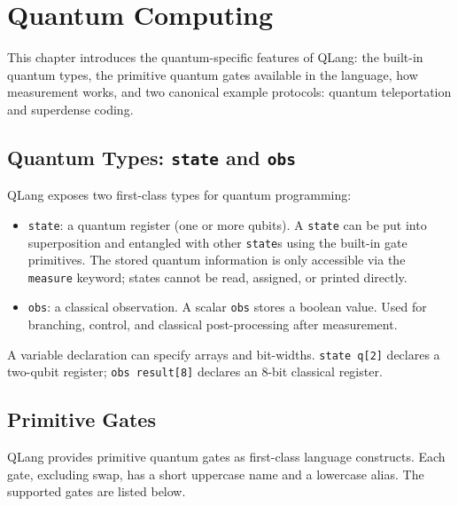\section{Quantum Computing}
\label{sec:quantum-computing}

This chapter introduces the quantum-specific features of QLang: the built-in
quantum types, the primitive quantum gates available in the language, how
measurement works, and two canonical example protocols: quantum
teleportation and superdense coding.

\subsection{Quantum Types: \texttt{state} and \texttt{obs}}
\label{sec:quantum-types}

QLang exposes two first-class types for quantum programming:

\begin{itemize}
    \item \texttt{state}: a quantum register (one or more qubits). A
        \texttt{state} can be put into superposition and entangled with other
        \texttt{state}s using the built-in gate primitives. The stored quantum
        information is only accessible via the \texttt{measure} keyword;
        states cannot be read, assigned, or printed directly.
    \item \texttt{obs}: a classical observation. A scalar \texttt{obs} stores
        a boolean value. Used for
        branching, control, and classical post-processing after measurement.
\end{itemize}

A variable declaration can specify arrays and bit-widths.
\texttt{state q[2]} declares a two-qubit register;
\texttt{obs result[8]} declares an 8-bit classical register.

\subsection{Primitive Gates}
\label{sec:quantum-gates}

QLang provides primitive quantum gates as first-class language constructs.
Each gate, excluding swap, has a short uppercase name and a lowercase alias.
The supported gates are listed below.

